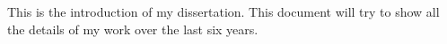 \label{ch:intro}
This is the introduction of my dissertation. This document will try to show all the details of my work over the last six years.
